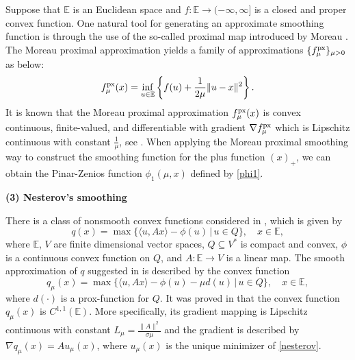 \documentclass[12pt]{article}
\newcommand{\ds}{\displaystyle}
\def \rla{\rangle}
\def \lla{\langle}
\begin{document}
 Suppose that $\mathbb{E}$ is an Euclidean space and $f:\mathbb{E} \to (-\infty,\infty]$
 is a closed and proper convex function. One natural tool for generating an approximate
 smoothing function is through the use of the so-called proximal map introduced by Moreau
 \cite{Mor65}. The Moreau proximal approximation yields a family of approximations
 $\{ f^{\rm px}_{\mu}\}_{\mu >0}$ as below:
 \begin{equation*}\label{moreau}
 f^{\rm px}_{\mu}(x)=\inf_{u\in \mathbb{E}} \left\{ f(u)+\frac{1}{2\mu}\|u-x\|^2 \right\}.
 \end{equation*}
 It is known that the Moreau proximal approximation $f^{\rm px}_{\mu}(x)$ is convex
 continuous, finite-valued, and differentiable with gradient $\nabla f^{\rm px}_{\mu}$
 which is Lipschitz continuous with constant $\frac{1}{\mu}$, see \cite{Mor65}.
 When applying the Moreau proximal smoothing way \cite{BM12} to construct the smoothing function
 for the plus function $(x)_+$, we can obtain the Pinar-Zenios function\cite{PZ1995}  $\phi_1(\mu, x)$
 defined by \eqref{phi1}.



 \noindent
 {\bf (3) Nesterov's smoothing}

 \medskip

 There is a class of nonsmooth convex functions considered in \cite{Nesterov05},
 which is given by
 \[
 q(x)=\max\{ \lla u,Ax \rla - \phi(u) \, | \, u \in Q\}, \quad x \in \mathbb{E},
 \]
 where $\mathbb{E}$, $V$ are finite dimensional vector spaces, $Q \subseteq V^*$
 is compact and convex, $\phi$ is a continuous convex function on $Q$, and
 $A :\mathbb{E} \to V $ is a linear map.
 The smooth approximation of $q$ suggested in \cite{Nesterov05} is described by
 the convex function
 \begin{equation*}\label{nesterov}
 q_\mu(x) =\max \{ \lla u, Ax \rla -\phi(u)-\mu d(u) \, | \, u\in Q\},
 \quad x \in \mathbb{E},
 \end{equation*}
 where $d(\cdot)$ is a prox-function for $Q$. It was proved in
 \cite[Theorem 1]{Nesterov05} that the convex function $q_\mu(x)$ is $C^{1,1}(\mathbb{E})$.
 More specifically, its gradient mapping is Lipschitz continuous with constant
 $L_\mu= \ds \frac{\|A\|^2}{\sigma \mu}$ and the gradient is described by
 $\nabla q_\mu(x)= A u_\mu(x)$, where $u_\mu(x)$ is the unique minimizer of \eqref{nesterov}.
 \\
\end{document}
